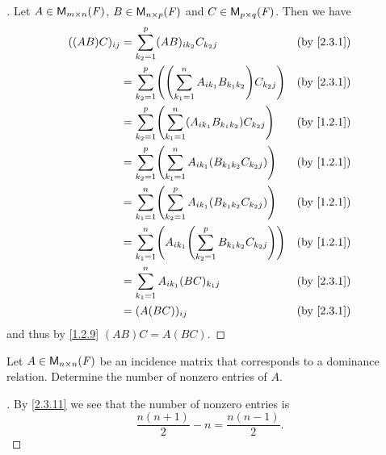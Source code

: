 \begin{proof}[]
	Let \(A \in \ms\), \(B \in \ms[n][p][\F]\) and \(C \in \ms[p][q][\F]\).
	Then we have
	\begin{align*}
		((AB) C)_{i j} & = \sum_{k_2 = 1}^p (AB)_{i k_2} C_{k_2 j}                                     &  & \by{2.3.1} \\
		               & = \sum_{k_2 = 1}^p \pa{\pa{\sum_{k_1 = 1}^n A_{i k_1} B_{k_1 k_2}} C_{k_2 j}} &  & \by{2.3.1} \\
		               & = \sum_{k_2 = 1}^p \pa{\sum_{k_1 = 1}^n (A_{i k_1} B_{k_1 k_2}) C_{k_2 j}}    &  & \by{1.2.1} \\
		               & = \sum_{k_2 = 1}^p \pa{\sum_{k_1 = 1}^n A_{i k_1} (B_{k_1 k_2} C_{k_2 j})}    &  & \by{1.2.1} \\
		               & = \sum_{k_1 = 1}^n \pa{\sum_{k_2 = 1}^p A_{i k_1} (B_{k_1 k_2} C_{k_2 j})}    &  & \by{1.2.1} \\
		               & = \sum_{k_1 = 1}^n \pa{A_{i k_1} \pa{\sum_{k_2 = 1}^p B_{k_1 k_2} C_{k_2 j}}} &  & \by{1.2.1} \\
		               & = \sum_{k_1 = 1}^n A_{i k_1} (BC)_{k_1 j}                                     &  & \by{2.3.1} \\
		               & = (A (BC))_{i j}                                                              &  & \by{2.3.1}
	\end{align*}
	and thus by \cref{1.2.9} \((AB) C = A (BC)\).
\end{proof}

\setcounter{ex}{22}
\begin{ex}\label{ex:2.3.23}
	Let \(A \in \ms[n][n][\F]\) be an incidence matrix that corresponds to a dominance relation.
	Determine the number of nonzero entries of \(A\).
\end{ex}

\begin{proof}[]
	By \cref{2.3.11} we see that the number of nonzero entries is
	\[
		\frac{n (n + 1)}{2} - n = \frac{n (n - 1)}{2}.
	\]
\end{proof}
